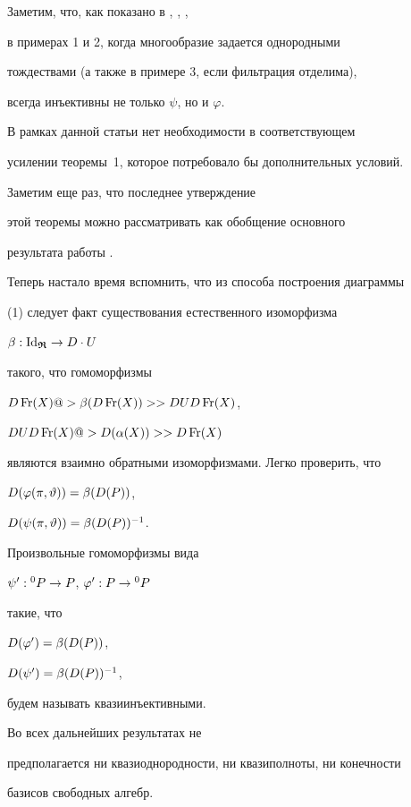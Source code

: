 Заметим, что, как показано в \cite{T2}, \cite{T4}, \cite{T6},


в примерах 1 и 2, когда многообразие задается однородными


тождествами (а также в примере 3, если фильтрация отделима),


всегда инъективны не только $\psi $, но и $\varphi$.


В рамках данной статьи нет необходимости в соответствующем


усилении теоремы~1, которое потребовало бы дополнительных условий.


Заметим еще раз, что последнее утверждение


этой теоремы можно рассматривать как обобщение основного


результата работы \cite{A1}.





Теперь настало время вспомнить, что из способа построения диаграммы


(1) следует факт существования естественного изоморфизма


$\beta : \operatorname{Id}_{\boldsymbol{\frak R}} \to D\cdot U$


такого, что гомоморфизмы\linebreak


$D\operatorname{Fr}(X) @>{\beta(D\operatorname{Fr}(X))}>> DUD\operatorname{Fr}(X)$,


$DUD\operatorname{Fr}(X) @>{D(\alpha(X))}>> D\operatorname{Fr}(X)$


являются взаимно обратными изоморфизмами. Легко проверить, что


$D(\varphi(\pi,\vartheta))=\beta(D(P))$,


$D(\psi(\pi,\vartheta))=\beta(D(P))^{-1}$.


Произвольные гомоморфизмы вида


$\psi': {}^0 P\to P$, $\varphi': P\to {}^0 P$


такие, что


$D(\varphi')=\beta(D(P))$,


$D(\psi')=\beta(D(P))^{-1}$,


будем называть квазиинъективными.


Во всех дальнейших результатах не


предполагается ни квазиоднородности, ни квазиполноты, ни конечности


базисов свободных алгебр.





